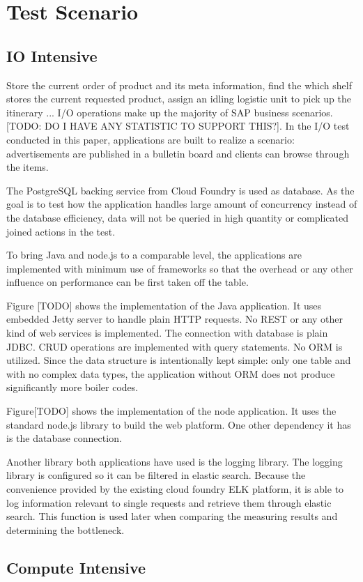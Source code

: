\chapter{Test Scenario}
\section{IO Intensive}
Store the current order of product and its meta information, find the which shelf stores the current requested product, assign an idling logistic unit to pick up the itinerary ... I/O operations make up the majority of SAP business scenarios.  [TODO: DO I HAVE ANY STATISTIC TO SUPPORT THIS?]. In the I/O test conducted in this paper, applications are built to realize a scenario: advertisements are published in a bulletin board and clients can browse through the items. 

The PostgreSQL backing service from Cloud Foundry is used as database. As the goal is to test how the application handles large amount of concurrency instead of the database efficiency, data will not be queried in high quantity or complicated joined actions  in the test. 

To bring Java and node.js to a comparable level, the applications are implemented with minimum use of frameworks so that the overhead or any other influence on performance can be first taken off the table. 

Figure [TODO] shows the implementation of the Java application. It uses embedded Jetty server to handle plain HTTP requests. No REST or any other kind of web services is implemented. The connection with database is plain JDBC. CRUD operations are implemented with query statements. No ORM is utilized. Since the data structure is intentionally kept simple: only one table and with no complex data types, the application without ORM does not produce significantly more boiler codes.
 
Figure[TODO] shows the implementation of the node application. It uses the standard node.js library to build the web platform. One other dependency it has is the database connection. 

Another library both applications have used is the logging library. The logging library is configured so it can be filtered in elastic search. Because the convenience provided by the existing cloud foundry ELK platform, it is able to log information relevant to single requests and retrieve them through elastic search. This function is used later when comparing the measuring results and determining the bottleneck. 
     
\section{Compute Intensive}
